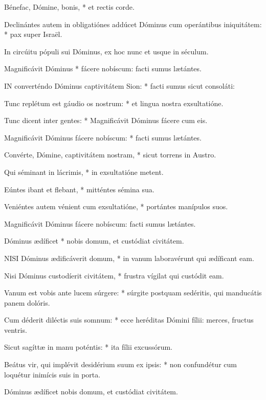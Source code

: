 Bénefac, Dómine, bonis, * et rectis corde.

Declinántes autem in obligatiónes addúcet Dóminus cum operántibus iniquitátem: * pax super Israël.

 In circúitu pópuli sui Dóminus, ex hoc nunc et usque in séculum.

 Magnificávit Dóminus * fácere nobíscum: facti sumus lætántes.


\lettrine[lines=2]{I}{N} converténdo Dóminus captivitátem Sion: * facti sumus sicut consoláti:

Tunc replétum est gáudio os nostrum: * et lingua nostra exsultatióne.

Tunc dicent inter gentes: * Magnificávit Dóminus fácere cum eis.

Magnificávit Dóminus fácere nobíscum: * facti sumus lætántes.

Convérte, Dómine, captivitátem nostram, * sicut torrens in Austro.

Qui séminant in lácrimis, * in exsultatióne metent.

Eúntes ibant et flebant, * mitténtes sémina sua.

Veniéntes autem vénient cum exsultatióne, * portántes manípulos suos.

 Magnificávit Dóminus fácere nobíscum: facti sumus lætántes.

 Dóminus ædíficet * nobis domum, et custódiat civitátem.


\lettrine[lines=2]{N}{ISI} Dóminus ædificáverit domum, * in vanum laboravérunt qui ædíficant eam.

Nisi Dóminus custodíerit civitátem, * frustra vígilat qui custódit eam.

Vanum est vobis ante lucem súrgere: * súrgite postquam sedéritis, qui manducátis panem dolóris.

Cum déderit diléctis suis somnum: * ecce heréditas Dómini fílii: merces, fructus ventris.

Sicut sagíttæ in manu poténtis: * ita fílii excussórum.

Beátus vir, qui implévit desidérium suum ex ipsis: * non confundétur cum loquétur inimícis suis in porta.

 Dóminus ædíficet nobis domum, et custódiat civitátem.


